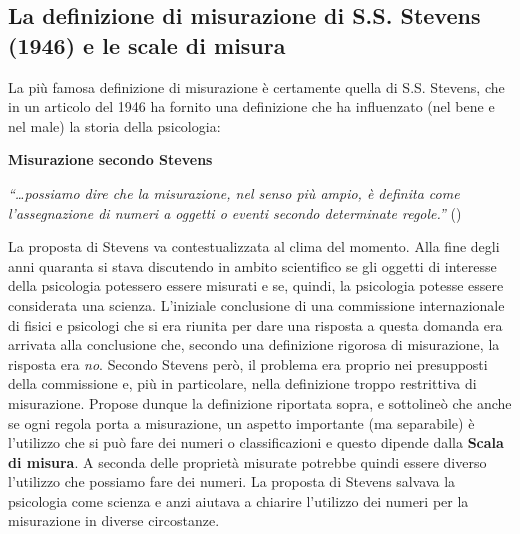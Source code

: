 \documentclass[
  italian,
  letterpaper,
  paper=A4,
  headinclude=on,
  footinclude=on,
  12pt]{scrbook}
\begin{document}
\subsection{La definizione di misurazione di S.S. Stevens (1946) e le
scale di
misura}\label{la-definizione-di-misurazione-di-s.s.-stevens-1946-e-le-scale-di-misura}

La più famosa definizione di misurazione è certamente quella di S.S.
Stevens, che in un articolo del 1946 ha fornito una definizione che ha
influenzato (nel bene e nel male) la storia della psicologia:

\begin{tcolorbox}[enhanced jigsaw, left=2mm, colbacktitle=quarto-callout-note-color!10!white, bottomrule=.15mm, opacityback=0, coltitle=black, colframe=quarto-callout-note-color-frame, opacitybacktitle=0.6, leftrule=.75mm, colback=white, toprule=.15mm, title=\textcolor{quarto-callout-note-color}{\faInfo}\hspace{0.5em}{Definizione}, titlerule=0mm, arc=.35mm, breakable, rightrule=.15mm, bottomtitle=1mm, toptitle=1mm]

\textbf{Misurazione secondo Stevens}

\emph{``\ldots possiamo dire che la misurazione, nel senso più ampio, è
definita come l'assegnazione di numeri a oggetti o eventi secondo
determinate regole.''} (\cite[p.~667]{stevens1946measurement})

\end{tcolorbox}

La proposta di Stevens va contestualizzata al clima del momento. Alla
fine degli anni quaranta si stava discutendo in ambito scientifico se
gli oggetti di interesse della psicologia potessero essere misurati e
se, quindi, la psicologia potesse essere considerata una scienza.
L'iniziale conclusione di una commissione internazionale di fisici e
psicologi che si era riunita per dare una risposta a questa domanda era
arrivata alla conclusione che, secondo una definizione rigorosa di
misurazione, la risposta era \emph{no}. Secondo Stevens però, il
problema era proprio nei presupposti della commissione e, più in
particolare, nella definizione troppo restrittiva di misurazione.
Propose dunque la definizione riportata sopra, e sottolineò che anche se
ogni regola porta a misurazione, un aspetto importante (ma separabile) è
l'utilizzo che si può fare dei numeri o classificazioni e questo dipende
dalla \textbf{Scala di misura}. A seconda delle proprietà misurate
potrebbe quindi essere diverso l'utilizzo che possiamo fare dei numeri.
La proposta di Stevens salvava la psicologia come scienza e anzi aiutava
a chiarire l'utilizzo dei numeri per la misurazione in diverse
circostanze.
\end{document}
